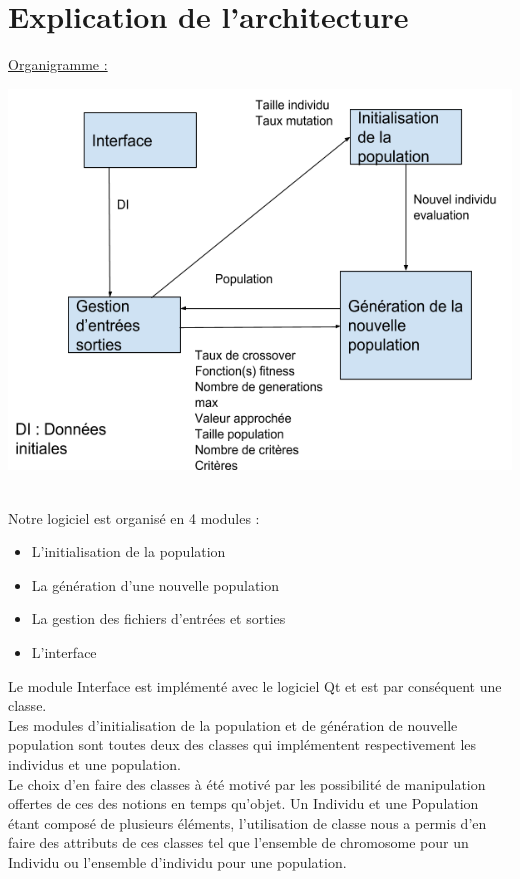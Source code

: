 \documentclass[a4paper,11pt]{article}
\begin{document}
	\section{Explication de l’architecture}
		\underline{Organigramme :}\\
		\centerline{\includegraphics[scale = 0.5]{OrganigrammeV9.png}}\\
		
		Notre logiciel est organisé en 4 modules :\\
		\begin{itemize}
			\item L’initialisation de la population
			\item La génération d’une nouvelle population
			\item La gestion des fichiers d’entrées et sorties
			\item L’interface\\
		\end{itemize}
		Le module Interface est implémenté avec le logiciel Qt et est par conséquent une classe.\\
		Les modules d’initialisation de la population et de génération de nouvelle population sont toutes deux des classes qui implémentent respectivement les individus et une population.\\
		Le choix d’en faire des classes à été motivé par les possibilité de manipulation offertes de ces des notions en temps qu’objet.
		Un Individu et une Population étant composé de plusieurs éléments, l’utilisation de classe nous a permis d’en faire des attributs de ces classes tel que l’ensemble de chromosome pour un Individu ou l’ensemble d’individu pour une population.\\\\
		
\end{document}
